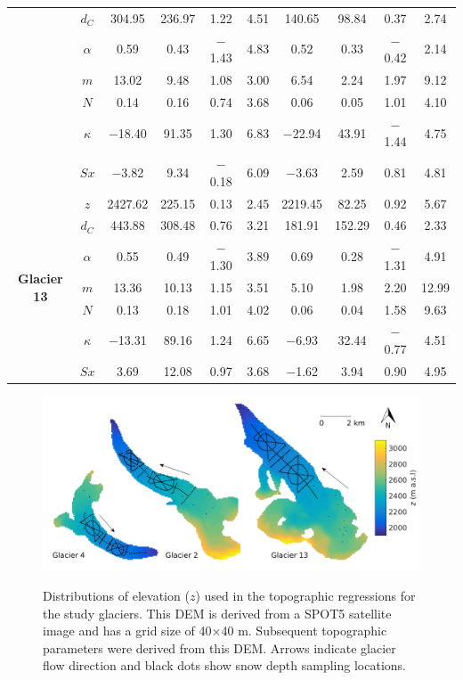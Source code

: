 \documentclass{sfuthesis}
\newcommand{\topomap}{Arrows indicate glacier flow direction and black dots show snow depth sampling locations. }
\begin{document}
\begin{table}
\begin{tabular}{cc|cccc|cccc}
 & $d_C$ & 304.95 & 236.97 & 1.22 & 4.51 & 140.65 & 98.84 & 0.37 & 2.74 \\
 & $\alpha$ & 0.59 & 0.43 & $-$1.43 & 4.83 & 0.52 & 0.33 & $-$0.42 & 2.14 \\
 & $m$ & 13.02 & 9.48 & 1.08 & 3.00 & 6.54 & 2.24 & 1.97 & 9.12 \\
 & $N$ & 0.14 & 0.16 & 0.74 & 3.68 & 0.06 & 0.05 & 1.01 & 4.10 \\
 & $\kappa$ & $-$18.40 & 91.35 & 1.30 & 6.83 & $-$22.94 & 43.91 & $-$1.44 & 4.75 \\
 & $Sx$ & $-$3.82 & 9.34 & $-$0.18 & 6.09 & $-$3.63 & 2.59 & 0.81 & 4.81 \\ \hline
\multirow{7}{*}{\textbf{Glacier 13}} & $z$ & 2427.62 & 225.15 & 0.13 & 2.45 & 2219.45 & 82.25 & 0.92 & 5.67 \\
 & $d_C$ & 443.88 & 308.48 & 0.76 & 3.21 & 181.91 & 152.29 & 0.46 & 2.33 \\
 & $\alpha$ & 0.55 & 0.49 & $-$1.30 & 3.89 & 0.69 & 0.28 & $-$1.31 & 4.91 \\
 & $m$ & 13.36 & 10.13 & 1.15 & 3.51 & 5.10 & 1.98 & 2.20 & 12.99 \\
 & $N$ & 0.13 & 0.18 & 1.01 & 4.02 & 0.06 & 0.04 & 1.58 & 9.63 \\
 & $\kappa$ & $-$13.31 & 89.16 & 1.24 & 6.65 & $-$6.93 & 32.44 & $-$0.77 & 4.51 \\
 & $Sx$ & 3.69 & 12.08 & 0.97 & 3.68 & $-$1.62 & 3.94 & 0.90 & 4.95
\end{tabular}
\end{table}

\pagebreak
\begin{figure}
	\centering
	\includegraphics[width = \textwidth]{Map_elevation.png}\\
	\caption{Distributions of elevation ($z$) used in the topographic regressions for the study glaciers. This DEM is derived from a SPOT5 satellite image and has a grid size of 40$\times$40 m. Subsequent topographic parameters were derived from this DEM. \topomap}
	\label{map:elev}
\end{figure}
\end{document}
